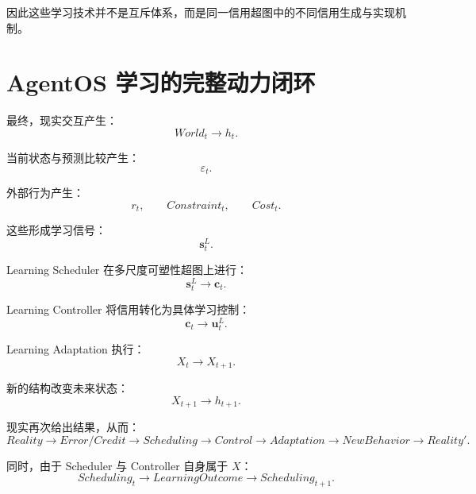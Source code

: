 因此这些学习技术并不是互斥体系，而是同一信用超图中的不同信用生成与实现机制。


\section{AgentOS 学习的完整动力闭环}

最终，现实交互产生：
\begin{equation}
World_t
\rightarrow
h_t.
\end{equation}

当前状态与预测比较产生：
\begin{equation}
\varepsilon_t.
\end{equation}

外部行为产生：
\begin{equation}
r_t,
\qquad
Constraint_t,
\qquad
Cost_t.
\end{equation}

这些形成学习信号：
\begin{equation}
\mathbf{s}_t^L.
\end{equation}

Learning Scheduler 在多尺度可塑性超图上进行：
\begin{equation}
\mathbf{s}_t^L
\rightarrow
\mathbf{c}_t.
\end{equation}

Learning Controller 将信用转化为具体学习控制：
\begin{equation}
\mathbf{c}_t
\rightarrow
\mathbf{u}_t^L.
\end{equation}

Learning Adaptation 执行：
\begin{equation}
X_t
\rightarrow
X_{t+1}.
\end{equation}

新的结构改变未来状态：
\begin{equation}
X_{t+1}
\rightarrow
h_{t+1}.
\end{equation}

现实再次给出结果，从而：
\begin{equation}
\boxed{
Reality
\rightarrow
Error/Credit
\rightarrow
Scheduling
\rightarrow
Control
\rightarrow
Adaptation
\rightarrow
NewBehavior
\rightarrow
Reality'.
}
\end{equation}

同时，由于 Scheduler 与 Controller 自身属于 $X$：
\begin{equation}
\boxed{
Scheduling_t
\rightarrow
LearningOutcome
\rightarrow
Scheduling_{t+1}.
}
\end{equation}

